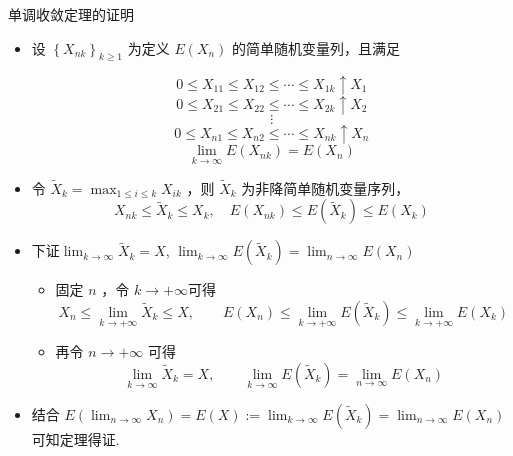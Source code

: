 \documentclass[Prob-All.tex]{subfiles}
\begin{document}
	\begin{frame}[allowframebreaks]{单调收敛定理的证明}
	\begin{itemize}
		\item 设 $\left\{X_{n k}\right\}_{k \geqslant 1}$ 为定义 $E\left(X_{n}\right)$ 的简单随机变量列，且满足

		\[0 \leqslant X_{11} \leqslant X_{12} \leqslant \cdots \leqslant X_{1 k} \uparrow X_{1} \]
		\[0 \leqslant X_{21} \leqslant X_{22} \leqslant \cdots \leqslant X_{2 k} \uparrow X_{2} \]
		\[\vdots\]
		\[0 \leqslant X_{n 1} \leqslant X_{n 2} \leqslant \cdots \leqslant X_{n k} \uparrow X_{n} \]
		\[\lim _{k \rightarrow \infty} E\left(X_{n k}\right)=E\left(X_{n}\right)\]

		\item 令 $\widetilde{X}_{k}=\max _{1 \leqslant i \leqslant k} X_{i k}$ ，则 $\widetilde{X}_{k}$ 为非降简单随机变量序列，
		\[
		X_{n k} \leqslant \widetilde{X}_{k} \leqslant X_{k}, \quad  E\left(X_{n k}\right) \leq E\left(\widetilde{X}_{k}\right) \leq E\left(X_{k}\right)
		\]
		\framebreak
        \item 下证$\lim _{k \rightarrow \infty} \widetilde{X}_{k}=X$, $\lim _{k \rightarrow \infty}E(\widetilde{X}_{k})=\lim_{n\rightarrow\infty}E(X_n)$

		\begin{itemize}
			\item 固定 $n$ ，令 $k \rightarrow+\infty$可得
			\[
			X_{n} \leq \lim _{k \rightarrow+\infty} \widetilde{X}_{k} \leq X, \qquad   E\left(X_{n}\right) \leq \lim _{k \rightarrow+\infty} E\left(\widetilde{X}_{k}\right) \leq \lim _{k \rightarrow+\infty}E{(X_k)}
			\]

			\item 再令 $n \rightarrow+\infty$ 可得
			\[
			\lim _{k \rightarrow \infty} \widetilde{X}_{k}=X, \qquad  \lim _{k \rightarrow \infty}E(\widetilde{X}_{k})=\lim_{n\rightarrow\infty}E(X_n)
			\]
		\end{itemize}
\item 结合 $E(\lim_{n\rightarrow\infty}X_n)=E(X):=\lim_{k\rightarrow\infty}E(\widetilde{X}_k)=\lim_{n\rightarrow\infty}E(X_n)$可知定理得证.
	\end{itemize}

	\end{frame}
\end{document}
